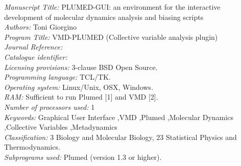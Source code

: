 \documentclass[preprint,review,11pt]{elsarticle}
\newcounter{bla}
\newcommand{\mytitle}{PLUMED-GUI: an environment for the interactive development 
  of molecular dynamics analysis and biasing scripts}
\newcommand{\mykeywords}{Graphical User Interface \sep VMD \sep Plumed \sep Molecular Dynamics \sep Collective Variables \sep Metadynamics}
\begin{document}
\begin{small}
\noindent
{\em Manuscript Title:}                                       
 \mytitle \\
{\em Authors:}                                                
 Toni Giorgino \\
{\em Program Title:}                                          
 VMD-PLUMED (Collective variable analysis plugin) \\
{\em Journal Reference:}                                      \\
{\em Catalogue identifier:}                                   \\
{\em Licensing provisions:}                                   
 3-clause BSD Open Source. \\
{\em Programming language:}                                   
 TCL/TK. \\
{\em Operating system:}                                       
 Linux/Unix, OSX, Windows. \\
{\em RAM:}                                               
 Sufficient to run Plumed [1] and VMD [2]. \\
{\em Number of processors used:}                              
 1 \\
{\em Keywords:} \mykeywords \\
{\em Classification:}                                         
  3 Biology and Molecular Biology, 23 Statistical Physics and Thermodynamics. \\
{\em Subprograms used:}                                       
  Plumed (version 1.3 or higher). \\

\end{small}
\end{document}
